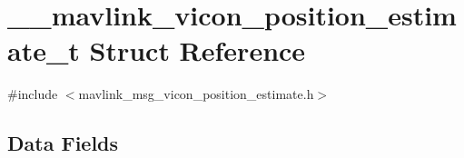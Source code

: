 \hypertarget{struct____mavlink__vicon__position__estimate__t}{\section{\-\_\-\-\_\-mavlink\-\_\-vicon\-\_\-position\-\_\-estimate\-\_\-t Struct Reference}
\label{struct____mavlink__vicon__position__estimate__t}
}


{\ttfamily \#include $<$mavlink\-\_\-msg\-\_\-vicon\-\_\-position\-\_\-estimate.\-h$>$}

\subsection*{Data Fields}
